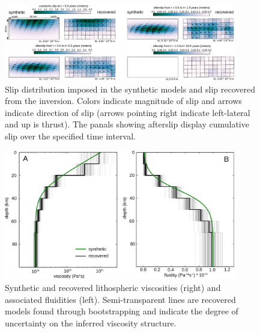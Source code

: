 \documentclass[extra]{gji}
\begin{document}
\begin{figure}[h!]\label{figure3}
  \centering
  \includegraphics[width=0.9\textwidth]{FinalFigures/Figure2.pdf}
  \caption{Slip distribution imposed in the synthetic models and slip
    recovered from the inversion. Colors indicate magnitude of slip
    and arrows indicate direction of slip (arrows pointing right
    indicate left-lateral and up is thrust).  The panals showing
    afterslip display cumulative slip over the specified time
    interval.}
  \label{Figure 3}
\end{figure}

\begin{figure}[h!]\label{figure4}
  \centering
  \includegraphics[width=0.9\textwidth]{FinalFigures/Figure3.pdf}
  \caption{Synthetic and recovered lithospheric viscosities (right)
    and associated fluidities (left).  Semi-transparent lines are recovered
    models found through bootstrapping and indicate the degree of
    uncertainty on the inferred viscosity structure.}
  \label{Figure 4}
\end{figure}
\end{document}
